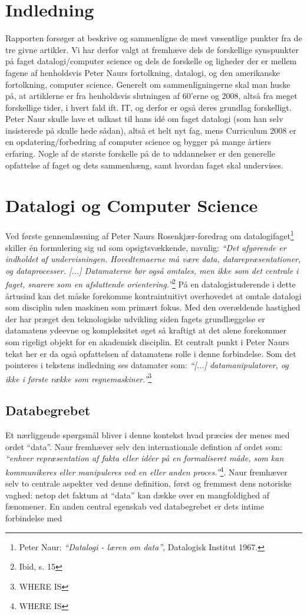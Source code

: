 \documentclass[10pt,a4paper]{article}
\newcommand{\citat}[2]{\vspace{0.2cm}\newline\textit{``#1''}\hspace{0.1cm}\footnote{#2}\vspace{0.2cm}\newline}
\begin{document}
\section{Indledning}
Rapporten forsøger at beskrive og sammenligne de mest væsentlige punkter fra de tre givne artikler. Vi har derfor valgt at fremhæve dels de forskellige synspunkter på faget datalogi/computer science og dels de forskelle og ligheder der er mellem fagene af henholdsvis Peter Naurs fortolkning, datalogi, og den amerikanske fortolkning, computer science.
Generelt om sammenligningerne skal man huske på, at artiklerne er fra henholdsvis slutningen af 60'erne og 2008, altså fra meget forskellige tider, i hvert fald ift. IT, og derfor er også deres grundlag forskelligt. Peter Naur skulle lave et udkast til hans idé om faget datalogi (som han selv insisterede på skulle hede sådan), altså et helt nyt fag, mens Curriculum 2008 er en opdatering/forbedring af computer science og bygger på mange årtiers erfaring.
Nogle af de største forskelle på de to uddannelser er den generelle opfattelse af faget og dets sammenhæng, samt hvordan faget skal undervises.


\section{Datalogi og Computer Science}
Ved første gennemlæsning af Peter Naurs Rosenkjær-foredrag om 
datalogifaget\footnote{Peter Naur: \emph{``Datalogi - læren om data''}, Datalogisk
Institut 1967.} skiller én formulering sig ud som opsigtsvækkende, navnlig: 
\citat{Det afgørende er indholdet af undervisningen. Hovedtemaerne må være data, 
datarepræsentationer, og dataprocesser. [...] Datamaterne bør også omtales, men
ikke som det centrale i faget, snarere som en afsluttende orientering.}{Ibid, s. 15} På en datalogistuderende i dette årtusind kan det 
måske forekomme kontraintuitivt overhovedet at omtale datalogi som disciplin
uden maskinen som primært fokus. Med den overældende hastighed der har præget
den teknologiske udvikling siden fagets grundlæggelse er datamatens ydeevne og 
kompleksitet øget så kraftigt at det alene forekommer som rigeligt objekt for 
en akademisk disciplin. Et centralt punkt i Peter Naurs tekst her er da også 
opfattelsen af datamatens rolle i denne forbindelse. Som det pointeres i tekstens 
indledning ses datamater som: \citat{[...] datamanipulatorer, og ikke i første række
som regnemaskiner.}{WHERE IS}
 
\subsection{Databegrebet}
Et nærliggende spørgsmål bliver i denne kontekst hvad præcies der menes med
ordet ``data''. Naur fremhæver selv den internationale defintion af ordet som: 
\citat{enhver repræsentation af fakta eller idéer på en formaliseret måde, som kan 
kommunikeres eller manipuleres ved en eller anden proces.}{WHERE IS}. Naur fremhæver selv 
to centrale aspekter ved denne definition, først og fremmest dens notoriske vaghed: netop det faktum at ``data'' kan dække over en mangfoldighed af fænomener. En anden central egenskab ved databegrebet er dets intime forbindelse med 
\end{document}
